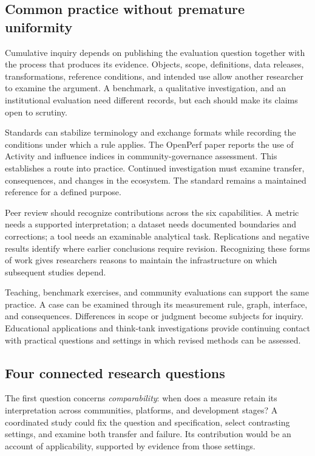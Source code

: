 \subsection{Common practice without premature uniformity}
Cumulative inquiry depends on publishing the evaluation question together with the process that produces its evidence. Objects, scope, definitions, data releases, transformations, reference conditions, and intended use allow another researcher to examine the argument. A benchmark, a qualitative investigation, and an institutional evaluation need different records, but each should make its claims open to scrutiny.

Standards can stabilize terminology and exchange formats while recording the conditions under which a rule applies. The OpenPerf paper reports the use of Activity and influence indices in community-governance assessment. This establishes a route into practice. Continued investigation must examine transfer, consequences, and changes in the ecosystem. The standard remains a maintained reference for a defined purpose.

Peer review should recognize contributions across the six capabilities. A metric needs a supported interpretation; a dataset needs documented boundaries and corrections; a tool needs an examinable analytical task. Replications and negative results identify where earlier conclusions require revision. Recognizing these forms of work gives researchers reasons to maintain the infrastructure on which subsequent studies depend.

Teaching, benchmark exercises, and community evaluations can support the same practice. A case can be examined through its measurement rule, graph, interface, and consequences. Differences in scope or judgment become subjects for inquiry. Educational applications and think-tank investigations provide continuing contact with practical questions and settings in which revised methods can be assessed.

\subsection{Four connected research questions}
The first question concerns \emph{comparability}: when does a measure retain its interpretation across communities, platforms, and development stages? A coordinated study could fix the question and specification, select contrasting settings, and examine both transfer and failure. Its contribution would be an account of applicability, supported by evidence from those settings.

